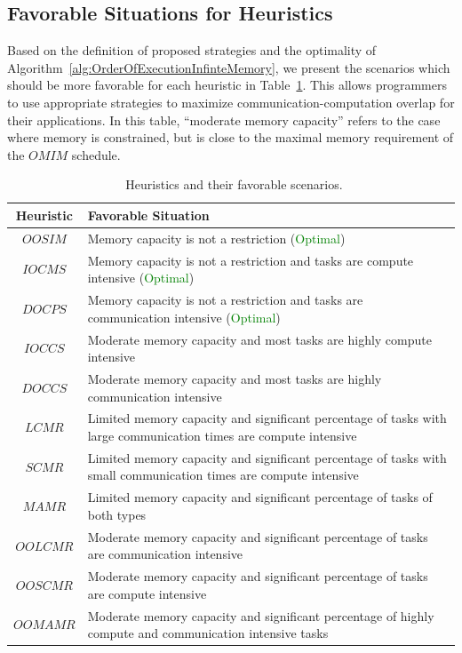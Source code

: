 \documentclass[sigconf]{acmart}
\begin{document}
{		\subsection{Favorable Situations for Heuristics}
		Based on the definition of proposed strategies and the optimality of Algorithm~\ref{alg:OrderOfExecutionInfinteMemory}, we present the scenarios which should be more favorable for each heuristic in Table~\ref{tab:heuristicsAndFavorableScenarios}. This allows programmers to use appropriate strategies to maximize communication-computation overlap for their applications. In this table, ``moderate memory capacity'' refers to the case where memory is constrained, but is close to the maximal memory requirement of the $OMIM$ schedule.
		
		\begin{table}[htb]
			\begin{tabular}{|c|p{6.5cm}|}
				\hline
				\textbf{Heuristic} & \textbf{\hspace{2cm}Favorable Situation} \\ \hline
				$OOSIM$ & Memory capacity is not a restriction (\textcolor{green}{Optimal}) \\ \hline
				$IOCMS$ & Memory capacity is not a restriction and tasks are compute intensive (\textcolor{green}{Optimal}) \\ \hline
				$DOCPS$ & Memory capacity is not a restriction and tasks are communication intensive (\textcolor{green}{Optimal}) \\ \hline
				$IOCCS$ & Moderate memory capacity and most tasks are highly compute intensive \\ \hline
				$DOCCS$ & Moderate memory capacity and most tasks are highly communication intensive \\ \hline
				$LCMR$ & Limited memory capacity and significant percentage of tasks with large communication times are compute intensive\\ \hline
				$SCMR$ & Limited memory capacity and significant percentage of tasks with small communication times are compute intensive\\ \hline
				$MAMR$ & Limited memory capacity and significant percentage of tasks of both types\\ \hline
				$OOLCMR$ & Moderate memory capacity and significant percentage of tasks are communication intensive\\ \hline
				$OOSCMR$ & Moderate memory capacity and significant percentage of tasks are compute intensive \\ \hline
				$OOMAMR$ & Moderate memory capacity and significant percentage of highly compute and communication intensive tasks \\ \hline
			\end{tabular}\caption{~\label{tab:heuristicsAndFavorableScenarios}Heuristics and their favorable scenarios.}
		\end{table}
		
}
\end{document}
